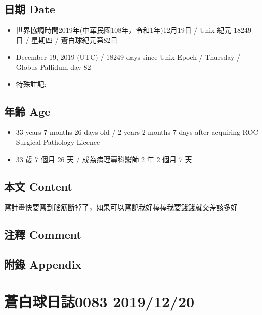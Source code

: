 \documentclass[a5paper, 12pt
]{book}
\providecommand{\tightlist}{%
  \setlength{\itemsep}{0pt}\setlength{\parskip}{0pt}}
\begin{document}
\hypertarget{ux65e5ux671f-date-18}{%
\subsection{日期 Date}\label{ux65e5ux671f-date-18}}

\begin{itemize}
\tightlist
\item
  世界協調時間2019年(中華民國108年，令和1年)12月19日 / Unix 紀元 18249
  日 / 星期四 / 蒼白球紀元第82日
\item
  December 19, 2019 (UTC) / 18249 days since Unix Epoch / Thursday /
  Globus Pallidum day 82
\item
  特殊註記:
\end{itemize}

\hypertarget{ux5e74ux9f61-age-18}{%
\subsection{年齡 Age}\label{ux5e74ux9f61-age-18}}

\begin{itemize}
\tightlist
\item
  33 years 7 months 26 days old / 2 years 2 months 7 days after
  acquiring ROC Surgical Pathology Licence
\item
  33 歲 7 個月 26 天 / 成為病理專科醫師 2 年 2 個月 7 天
\end{itemize}

\hypertarget{ux672cux6587-content-18}{%
\subsection{本文 Content}\label{ux672cux6587-content-18}}

寫計畫快要寫到腦筋斷掉了，如果可以寫說我好棒棒我要錢錢就交差該多好

\hypertarget{ux6ce8ux91cb-comment-17}{%
\subsection{注釋 Comment}\label{ux6ce8ux91cb-comment-17}}

\hypertarget{ux9644ux9304-appendix-18}{%
\subsection{附錄 Appendix}\label{ux9644ux9304-appendix-18}}

\hypertarget{ux84bcux767dux7403ux65e5ux8a8c0083-20191220}{%
\section{蒼白球日誌0083
2019/12/20}\label{ux84bcux767dux7403ux65e5ux8a8c0083-20191220}}
\end{document}
